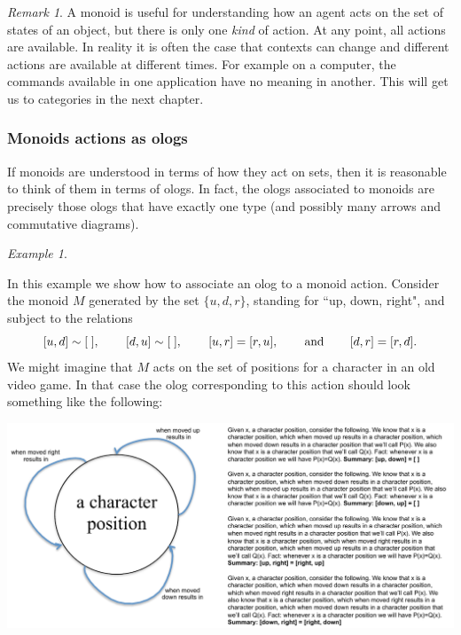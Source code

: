 \documentclass{book}
\def\tn{\textnormal}
\def\hsp{\hspace{.3in}}
\theoremstyle{remark}
\newtheorem{remark}[subsubsection]{Remark}
\newtheorem{example}[subsubsection]{Example}
\theoremstyle{definition}
\begin{document}
\begin{remark}

A monoid is useful for understanding how an agent acts on the set of states of an object, but there is only one {\em kind} of action. At any point, all actions are available. In reality it is often the case that contexts can change and different actions are available at different times. For example on a computer, the commands available in one application have no meaning in another. This will get us to categories in the next chapter. 

\end{remark}



\subsubsection{Monoids actions as ologs}

If monoids are understood in terms of how they act on sets, then it is reasonable to think of them in terms of ologs. In fact, the ologs associated to monoids are precisely those ologs that have exactly one type (and possibly many arrows and commutative diagrams). 

\begin{example}\label{ex:monoid as olog}

In this example we show how to associate an olog to a monoid action. Consider the monoid $M$ generated by the set $\{u,d,r\}$, standing for ``up, down, right", and subject to the relations $$[u,d]\sim[\;],\hsp[d,u]\sim[\;],\hsp[u,r]=[r,u],\hsp \tn{and}\hsp [d,r]=[r,d].$$
We might imagine that $M$ acts on the set of positions for a character in an old video game. In that case the olog corresponding to this action should look something like the following:
\begin{center}
\includegraphics[width=\textwidth]{monoidOlog}
\end{center}

\end{example}
\end{document}
